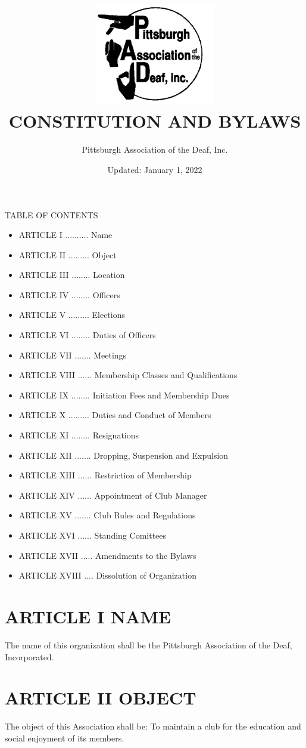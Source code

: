 \documentclass[12pt,letterpaper]{article}
\title{\includegraphics{padlogo.png}\\CONSTITUTION AND BYLAWS}
\author{Pittsburgh Association of the Deaf, Inc.}
\date{Updated: January 1, 2022}
\begin{document}
\maketitle
\newpage

TABLE OF CONTENTS
\begin{itemize}
\item ARTICLE I .......... Name
\item ARTICLE II ......... Object
\item ARTICLE III ........ Location
\item ARTICLE IV ........ Officers
\item ARTICLE V ......... Elections
\item ARTICLE VI ........ Duties of Officers
\item ARTICLE VII ....... Meetings
\item ARTICLE VIII ...... Membership Classes and Qualifications
\item ARTICLE IX ........ Initiation Fees and Membership Dues
\item ARTICLE X ......... Duties and Conduct of Members
\item ARTICLE XI ........ Resignations
\item ARTICLE XII ....... Dropping, Suspension and Expulsion
\item ARTICLE XIII ...... Restriction of Membership
\item ARTICLE XIV ...... Appointment of Club Manager
\item ARTICLE XV ....... Club Rules and Regulations
\item ARTICLE XVI ...... Standing Comittees
\item ARTICLE XVII ..... Amendments to the Bylaws
\item ARTICLE XVIII .... Dissolution of Organization
\end{itemize}

\newpage

\section*{ARTICLE I 
NAME}

The name of this organization shall be the Pittsburgh Association of the Deaf,
Incorporated.

\section*{ARTICLE II
OBJECT}

The object of this Association shall be: To maintain a club for the education and social
enjoyment of its members.
\end{document}
